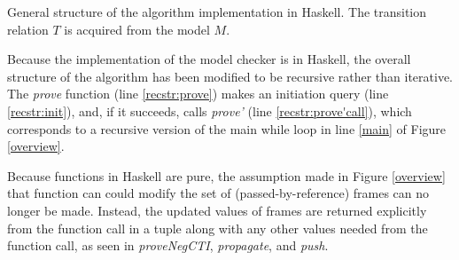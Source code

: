 \documentclass[12pt,a4paper,twoside,openright]{report}
\begin{document}
{
\begin{algorithm}[t]
\DontPrintSemicolon
{}
\caption{General structure of the algorithm implementation in Haskell. The transition relation $T$ is acquired
from the model $M$.}
\label{recstr}
\end{algorithm}

Because the implementation of the model checker is in Haskell, the overall
structure of the algorithm has been modified to be recursive rather than iterative.
The {\it prove} function (line \ref{recstr:prove}) makes an initiation query
(line \ref{recstr:init}), and, if it succeeds, calls
{\it prove'} (line \ref{recstr:prove'call}),
which corresponds to a recursive version of the main while loop
in line \ref{main} of Figure \ref{overview}.

Because functions in Haskell are pure, the assumption made in Figure \ref{overview}
that function can could modify the set of (passed-by-reference) frames can no longer be made.
Instead, the updated values of frames are returned explicitly from the function call in
a tuple along with any other values needed from the function call, as seen in
{\it proveNegCTI}, {\it propagate}, and {\it push}.

}
\end{document}
